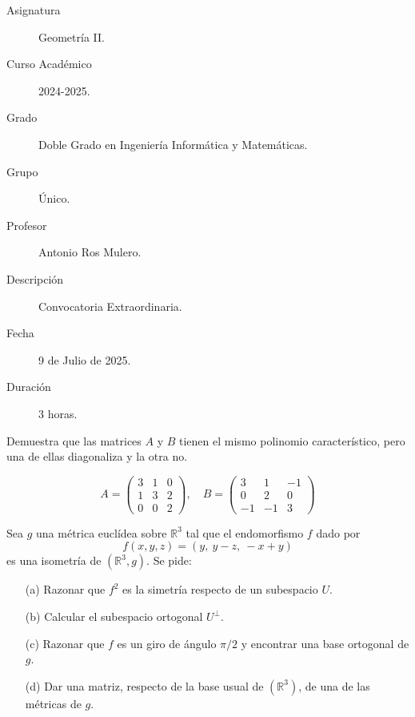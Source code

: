\documentclass[12pt]{article}
\begin{document}
	
	
	
	
	
	\begin{description}
		\item[Asignatura] Geometría II.
		\item[Curso Académico] 2024-2025.
		\item[Grado] Doble Grado en Ingeniería Informática y Matemáticas.
		\item[Grupo] Único.
		\item[Profesor] Antonio Ros Mulero.
		\item[Descripción] Convocatoria Extraordinaria.
		\item[Fecha] 9 de Julio de 2025.
		\item[Duración] 3 horas.
	\end{description}
	\newpage
	
	
	\begin{ejercicio}[2 puntos]
		Demuestra que las matrices $A$ y $B$ tienen el mismo polinomio característico, pero una de ellas diagonaliza y la otra no.
		
		\[
		A = \begin{pmatrix}
			3 & 1 & 0 \\
			1 & 3 & 2 \\
			0 & 0 & 2
		\end{pmatrix}, \quad
		B = \begin{pmatrix}
			3 & 1 & -1 \\
			0 & 2 & 0 \\
			-1 & -1 & 3
		\end{pmatrix}
		\]
		
	\end{ejercicio}

	\begin{ejercicio}[4 puntos]
		Sea $g$ una métrica euclídea sobre $\mathbb{R}^3$ tal que el endomorfismo $f$ dado por
		\[
		f(x, y, z) = (y,\ y - z,\ -x + y)
		\]
		es una isometría de $(\mathbb{R}^3, g)$. Se pide:
		\begin{enumerate}
			\item[(a)] Razonar que $f^2$ es la simetría respecto de un subespacio $U$.
			\item[(b)] Calcular el subespacio ortogonal $U^\perp$.
			\item[(c)] Razonar que $f$ es un giro de ángulo $\pi/2$ y encontrar una base ortogonal de $g$.
			\item[(d)] Dar una matriz, respecto de la base usual de $(\mathbb{R}^3)$, de una de las métricas de $g$.
		\end{enumerate}
	\end{ejercicio}
\end{document}
